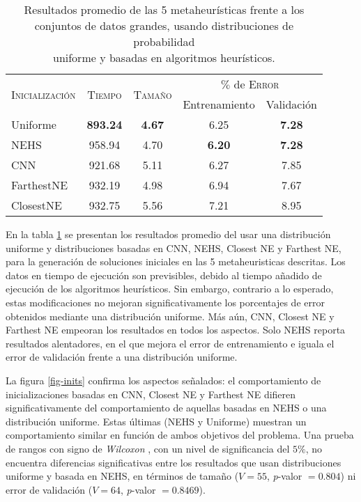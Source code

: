\begin{table}[h!]
\centering
\begin{tabular}{l c c c c}
\hline
\multirow{2}{*}{\textsc{Inicialización}}
	& \multirow{2}{*}{\textsc{Tiempo}}
	& \multirow{2}{*}{\textsc{Tamaño}}
	& \multicolumn{2}{c}{$\%$ de \textsc{Error}} \\\cline{4-5}
 & & & \scriptsize{Entrenamiento} & \scriptsize{Validación} \\
\hline
\hline
Uniforme   & \textbf{893.24} & \textbf{4.67} & 6.25 & \textbf{7.28} \\
NEHS       & 958.94 & 4.70 & \textbf{6.20} & \textbf{7.28} \\
CNN        & 921.68 & 5.11 & 6.27 & 7.85 \\
FarthestNE & 932.19 & 4.98 & 6.94 & 7.67 \\
ClosestNE  & 932.75 & 5.56 & 7.21 & 8.95 \\
\hline
\end{tabular}
\caption[Resultados usando distribuciones uniforme y heurísticas]{Resultados promedio de las 5 metaheurísticas frente a los\\conjuntos de datos grandes, usando distribuciones de probabilidad\\uniforme y basadas en algoritmos heurísticos.}
\label{table-inits}
\end{table}

En la tabla \ref{table-inits} se presentan los resultados promedio del usar una distribución uniforme y distribuciones basadas en CNN, NEHS, Closest NE y Farthest NE, para la generación de soluciones iniciales en las 5 metaheuristicas descritas. Los datos en tiempo de ejecución son previsibles, debido al tiempo añadido de ejecución de los algoritmos heurísticos. Sin embargo, contrario a lo esperado, estas modificaciones no mejoran significativamente los porcentajes de error obtenidos mediante una distribución uniforme. Más aún, CNN, Closest NE y Farthest NE empeoran los resultados en todos los aspectos. Solo NEHS reporta resultados alentadores, en el que mejora el error de entrenamiento e iguala el error de validación frente a una distribución uniforme.

La figura \ref{fig-inits} confirma los aspectos señalados: el comportamiento de inicializaciones basadas en CNN, Closest NE y Farthest NE difieren significativamente del comportamiento de aquellas basadas en NEHS o una distribución uniforme. Estas últimas (NEHS y Uniforme) muestran un comportamiento similar en función de ambos objetivos del problema. Una prueba de rangos con signo de \emph{Wilcoxon} \cite{wilcoxon1945individual}, con un nivel de significancia del $5\%$, no encuentra diferencias significativas entre los resultados que usan distribuciones uniforme y basada en NEHS, en términos de tamaño ($V = 55$, \emph{p}-valor $= 0.804$) ni error de validación ($V = 64$, \emph{p}-valor $= 0.8469$).

